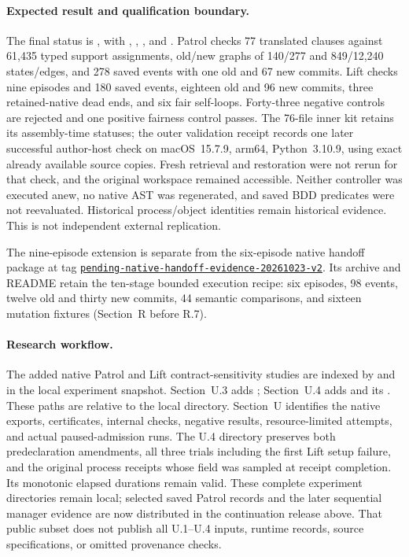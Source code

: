 \paragraph{Expected result and qualification boundary.}
The final status is ,
with , ,
, and .
Patrol checks 77 translated clauses against 61,435 typed support assignments,
old/new graphs of 140/277 and 849/12,240 states/edges, and 278 saved events
with one old and 67 new commits. Lift checks nine episodes and 180 saved
events, eighteen old and 96 new commits, three retained-native dead ends,
and six fair self-loops. Forty-three negative controls are rejected and
one positive fairness control passes.
The 76-file inner kit retains its assembly-time statuses; the outer
validation receipt records one later successful author-host check on
macOS~15.7.9, arm64, Python~3.10.9, using exact already available source
copies. Fresh retrieval and restoration were not rerun for that check,
and the original workspace remained accessible. Neither controller was
executed anew, no native AST was regenerated, and saved BDD predicates
were not reevaluated. Historical process/object identities remain
historical evidence. This is not independent external replication.

The nine-episode extension is separate from the six-episode native
handoff package at tag
\href{https://github.com/research-artifact-archive/seams2027/tree/pending-native-handoff-evidence-20261023-v2}{\nolinkurl{pending-native-handoff-evidence-20261023-v2}}.
Its archive  and
README retain the ten-stage bounded execution recipe: six episodes,
98 events, twelve old and thirty new commits, 44 semantic comparisons,
and sixteen mutation fixtures (Section~R before R.7).

\paragraph{Research workflow.}
The added native Patrol and Lift contract-sensitivity studies are indexed
by  and
 in the
local experiment snapshot. Section~U.3 adds
; Section~U.4 adds
 and its
. These paths are relative to the local
 directory. Section~U identifies the native exports,
certificates, internal checks, negative results, resource-limited attempts,
and actual paused-admission runs. The U.4 directory preserves both
predeclaration amendments, all three trials including the first Lift
setup failure, and the original process receipts whose
 field was sampled at receipt completion. Its monotonic
elapsed durations remain valid. These complete experiment directories
remain local; selected saved Patrol records and the later sequential
manager evidence are now distributed in the continuation release above.
That public subset does not publish all U.1--U.4 inputs, runtime records,
source specifications, or omitted provenance checks.
